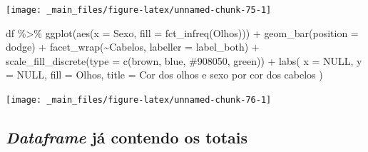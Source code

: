 \documentclass[
  11pt]{report}
\newenvironment{Shaded}{\begin{snugshade}}{\end{snugshade}}
\newcommand{\AttributeTok}[1]{\textcolor[rgb]{0.77,0.63,0.00}{#1}}
\newcommand{\ConstantTok}[1]{\textcolor[rgb]{0.00,0.00,0.00}{#1}}
\newcommand{\FunctionTok}[1]{\textcolor[rgb]{0.00,0.00,0.00}{#1}}
\newcommand{\NormalTok}[1]{#1}
\newcommand{\SpecialCharTok}[1]{\textcolor[rgb]{0.00,0.00,0.00}{#1}}
\newcommand{\StringTok}[1]{\textcolor[rgb]{0.31,0.60,0.02}{#1}}
\renewenvironment{Shaded}{
  \begin{mdframed}[%
    roundcorner=2pt,%
    innerleftmargin=5pt,%
    innerrightmargin=5pt,%
    topline=true,%
    leftline=true,%
    rightline=true,%
    bottomline=true,%
    linewidth=0.5pt,%
    linecolor=black!20,%
    backgroundcolor=black!2,%
    skipabove=2ex,%
    skipbelow=2.5ex%
  ]%
}
{
  \end{mdframed}
}
\begin{document}
\begin{center}\texttt{[image: \_main\_files/figure-latex/unnamed-chunk-75-1]} \end{center}

\begin{Shaded}
\begin{Highlighting}[]
\NormalTok{df }\SpecialCharTok{\%\textgreater{}\%} 
  \FunctionTok{ggplot}\NormalTok{(}\FunctionTok{aes}\NormalTok{(}\AttributeTok{x =}\NormalTok{ Sexo, }\AttributeTok{fill =} \FunctionTok{fct\_infreq}\NormalTok{(Olhos))) }\SpecialCharTok{+}
    \FunctionTok{geom\_bar}\NormalTok{(}\AttributeTok{position =} \StringTok{\textquotesingle{}dodge\textquotesingle{}}\NormalTok{) }\SpecialCharTok{+}
    \FunctionTok{facet\_wrap}\NormalTok{(}\SpecialCharTok{\textasciitilde{}}\NormalTok{Cabelos, }\AttributeTok{labeller =}\NormalTok{ label\_both) }\SpecialCharTok{+}
    \FunctionTok{scale\_fill\_discrete}\NormalTok{(}\AttributeTok{type =} \FunctionTok{c}\NormalTok{(}\StringTok{\textquotesingle{}brown\textquotesingle{}}\NormalTok{, }\StringTok{\textquotesingle{}blue\textquotesingle{}}\NormalTok{, }\StringTok{\textquotesingle{}\#908050\textquotesingle{}}\NormalTok{, }\StringTok{\textquotesingle{}green\textquotesingle{}}\NormalTok{)) }\SpecialCharTok{+}
    \FunctionTok{labs}\NormalTok{(}
      \AttributeTok{x =} \ConstantTok{NULL}\NormalTok{,}
      \AttributeTok{y =} \ConstantTok{NULL}\NormalTok{,}
      \AttributeTok{fill =} \StringTok{\textquotesingle{}Olhos\textquotesingle{}}\NormalTok{,}
      \AttributeTok{title =} \StringTok{\textquotesingle{}Cor dos olhos e sexo por cor dos cabelos\textquotesingle{}}
\NormalTok{    )}
\end{Highlighting}
\end{Shaded}

\begin{center}\texttt{[image: \_main\_files/figure-latex/unnamed-chunk-76-1]} \end{center}

\hypertarget{dataframe-juxe1-contendo-os-totais}{%
\subsection{\texorpdfstring{\emph{Dataframe} já contendo os totais}{Dataframe já contendo os totais}}\label{dataframe-juxe1-contendo-os-totais}}
\end{document}

